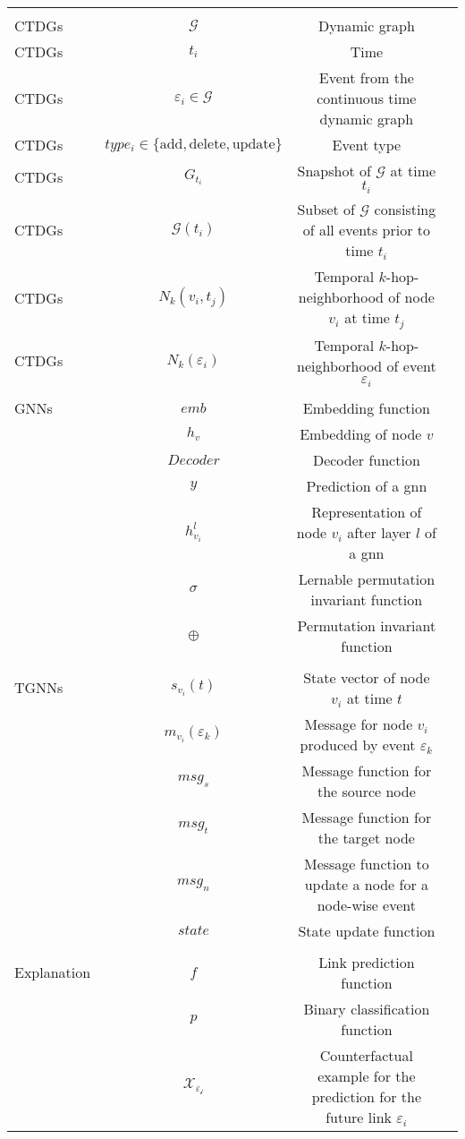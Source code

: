 \begin{table}[ht]
\begin{tabular}{lccl}
 & & &\\
 CTDGs& $\mathcal{G}$& Dynamic graph&\\
 CTDGs& $t_i$& Time&\\
 CTDGs& $\varepsilon_i \in \mathcal{G}$& Event from the continuous time dynamic graph&\\
 CTDGs& $type_i \in \{ \mathrm{add, delete, update}\}$& Event type&\\
 CTDGs& $G_{t_i}$& Snapshot of $\mathcal{G}$ at time $t_i$&\\
 CTDGs& $\mathcal{G}(t_i)$& Subset of $\mathcal{G}$ consisting of all events prior to time $t_i$&\\
 CTDGs& $N_k(v_i, t_j)$& Temporal $k$-hop-neighborhood of node $v_i$ at time $t_j$&\\
 CTDGs& $N_k(\varepsilon_i)$& Temporal $k$-hop-neighborhood of event $\varepsilon_i$&\\
 & & &\\
 GNNs& $emb$& Embedding function&\\
 & $h_v$& Embedding of node $v$&\\
 & $Decoder$& Decoder function&\\
 & $y$& Prediction of a \gls{gnn}&\\
 & $h_{v_i}^l$& Representation of node $v_i$ after layer $l$ of a \gls{gnn}&\\
 & $\sigma$& Lernable permutation invariant function&\\
 & $\oplus$& Permutation invariant function&\\
 & & &\\
 TGNNs& $s_{v_i}(t)$& State vector of node $v_i$ at time $t$&\\
 & $m_{v_i}(\varepsilon_k)$& Message for node $v_i$ produced by event $\varepsilon_k$&\\
 & $msg_s$& Message function for the source node&\\
 & $msg_t$& Message function for the target node&\\
 & $msg_n$& Message function to update a node for a node-wise event&\\
 & $state$& State update function&\\
 & & &\\
 Explanation& $f$& Link prediction function&\\
 & $p$& Binary classification function&\\
 & $\mathcal{X_{\varepsilon_i}}$& Counterfactual example for the prediction for the future link $\varepsilon_i$&\\

\end{tabular}
\end{table}
